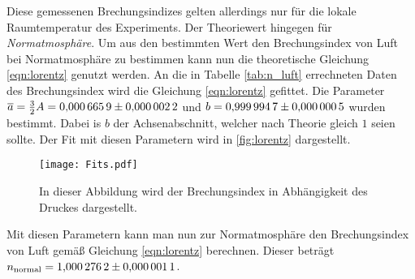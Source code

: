 Diese gemessenen Brechungsindizes gelten allerdings nur für die lokale Raumtemperatur des Experiments. Der Theoriewert hingegen für \textit{Normatmosphäre}. Um aus den bestimmten 
Wert den Brechungsindex von Luft bei Normatmosphäre zu bestimmen kann nun die theoretische Gleichung \ref{eqn:lorentz} genutzt werden. An die in Tabelle \ref{tab:n_luft} errechneten 
Daten des Brechungsindex wird die Gleichung \ref{eqn:lorentz} gefittet. Die Parameter $\overline{a} = \frac{3}{2}A = \num{0.0006659 \pm 0.0000022}$ und $b = \num{0.9999947 \pm 0.0000005}$ wurden bestimmt. Dabei is $b$
der Achsenabschnitt, welcher nach Theorie gleich $1$ seien sollte. Der Fit mit diesen Parametern wird in \autoref{fig:lorentz} dargestellt.

\begin{figure}
  \centering
  \texttt{[image: Fits.pdf]}
  \caption{In dieser Abbildung wird der Brechungsindex in Abhängigkeit des Druckes dargestellt.}
  \label{fig:lorentz}
\end{figure}

Mit diesen Parametern kann man nun zur Normatmosphäre den Brechungsindex von Luft gemäß Gleichung \ref{eqn:lorentz} berechnen. Dieser beträgt $n_\mathrm{normal} = \num{1.0002762 \pm 0.0000011}$.
